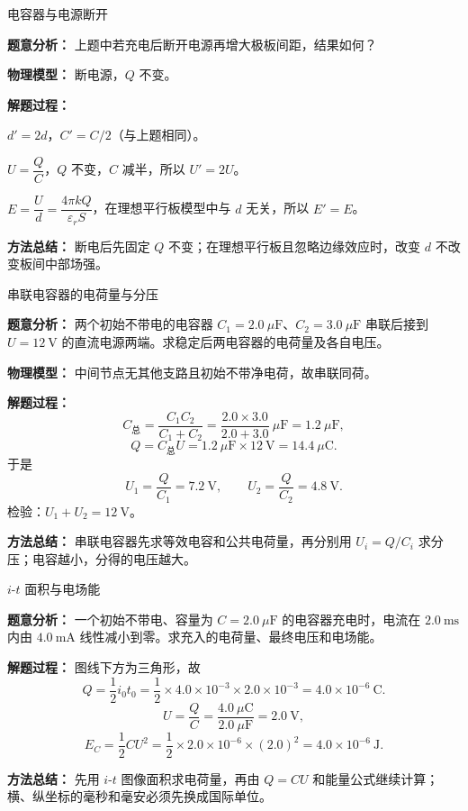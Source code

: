 \begin{examplebox}{电容器与电源断开}

\textbf{题意分析：} 上题中若充电后断开电源再增大极板间距，结果如何？

\textbf{物理模型：} 断电源，$Q$ 不变。

\textbf{解题过程：}

$d' = 2d$，$C' = C/2$（与上题相同）。

$U = \dfrac{Q}{C}$，$Q$ 不变，$C$ 减半，所以 $U' = 2U$。

$E = \dfrac{U}{d} = \dfrac{4\pi k Q}{\varepsilon_r S}$，在理想平行板模型中与 $d$ 无关，所以 $E' = E$。

\textbf{方法总结：} 断电后先固定 $Q$ 不变；在理想平行板且忽略边缘效应时，改变 $d$ 不改变板间中部场强。

\end{examplebox}

\begin{examplebox}{串联电容器的电荷量与分压}

\textbf{题意分析：} 两个初始不带电的电容器 $C_1=2.0\ \mu\mathrm F$、$C_2=3.0\ \mu\mathrm F$ 串联后接到 $U=12\ \mathrm V$ 的直流电源两端。求稳定后两电容器的电荷量及各自电压。

\begin{center}

\end{center}

\textbf{物理模型：} 中间节点无其他支路且初始不带净电荷，故串联同荷。

\textbf{解题过程：}
\[
C_{\text{总}}=\frac{C_1C_2}{C_1+C_2}
=\frac{2.0\times3.0}{2.0+3.0}\ \mu\mathrm F
=1.2\ \mu\mathrm F,
\]
\[
Q=C_{\text{总}}U=1.2\ \mu\mathrm F\times12\ \mathrm V
=14.4\ \mu\mathrm C.
\]
于是
\[
U_1=\frac{Q}{C_1}=7.2\ \mathrm V,\qquad
U_2=\frac{Q}{C_2}=4.8\ \mathrm V.
\]
检验：$U_1+U_2=12\ \mathrm V$。

\textbf{方法总结：} 串联电容器先求等效电容和公共电荷量，再分别用 $U_i=Q/C_i$ 求分压；电容越小，分得的电压越大。

\end{examplebox}

\begin{examplebox}{$i$-$t$ 面积与电场能}

\textbf{题意分析：} 一个初始不带电、容量为 $C=2.0\ \mu\mathrm F$ 的电容器充电时，电流在 $2.0\ \mathrm{ms}$ 内由 $4.0\ \mathrm{mA}$ 线性减小到零。求充入的电荷量、最终电压和电场能。

\begin{center}

\end{center}

\textbf{解题过程：} 图线下方为三角形，故
\[
Q=\frac12 i_0t_0
=\frac12\times4.0\times10^{-3}\times2.0\times10^{-3}
=4.0\times10^{-6}\ \mathrm C.
\]
\[
U=\frac{Q}{C}
=\frac{4.0\ \mu\mathrm C}{2.0\ \mu\mathrm F}
=2.0\ \mathrm V,
\]
\[
E_C=\frac12CU^2
=\frac12\times2.0\times10^{-6}\times(2.0)^2
=4.0\times10^{-6}\ \mathrm J.
\]

\textbf{方法总结：} 先用 $i$-$t$ 图像面积求电荷量，再由 $Q=CU$ 和能量公式继续计算；横、纵坐标的毫秒和毫安必须先换成国际单位。

\end{examplebox}

